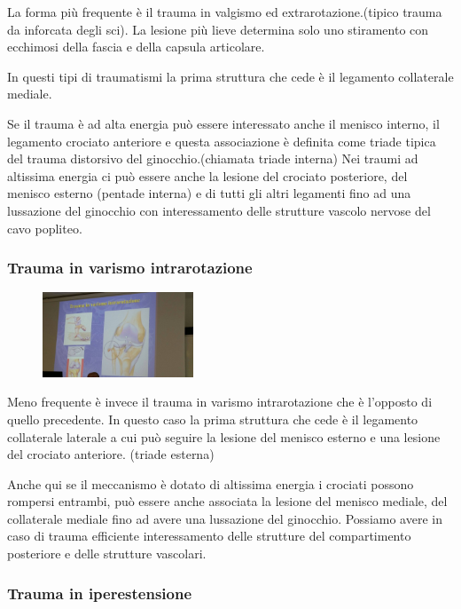 La forma più frequente è il trauma in valgismo ed extrarotazione.(tipico trauma da inforcata degli sci). La lesione più lieve determina solo uno stiramento con ecchimosi della fascia e della capsula articolare.

In questi tipi di traumatismi la prima struttura che cede è il legamento collaterale mediale.

Se il trauma è ad alta energia può essere interessato anche il menisco interno, il legamento crociato anteriore e questa associazione è definita come triade tipica del trauma distorsivo del ginocchio.(chiamata triade interna) Nei traumi ad altissima energia ci può essere anche la lesione del crociato posteriore, del menisco esterno (pentade interna) e di tutti gli altri legamenti fino ad una lussazione del ginocchio con interessamento delle strutture vascolo nervose del
cavo popliteo.

\subsubsection{Trauma in varismo intrarotazione}

\begin{figure}[!ht]
\centering
\includegraphics[width=0.4\textwidth]{008/image6.jpeg}
\end{figure}

Meno frequente è invece il trauma in varismo intrarotazione che è l'opposto di quello precedente. In questo caso la prima struttura che cede è il legamento collaterale laterale a cui può seguire la lesione del menisco esterno e una lesione del crociato anteriore. (triade esterna)

Anche qui se il meccanismo è dotato di altissima energia i crociati possono rompersi entrambi, può essere anche associata la lesione del menisco mediale, del collaterale mediale fino ad avere una lussazione del ginocchio. Possiamo avere in caso di trauma efficiente interessamento delle strutture del compartimento posteriore e delle strutture vascolari.

\subsubsection{Trauma in iperestensione}

